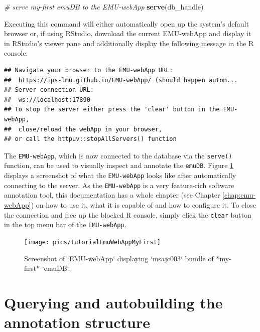 \documentclass[]{book}
\newenvironment{Shaded}{\begin{snugshade}}{\end{snugshade}}
\newcommand{\CommentTok}[1]{\textcolor[rgb]{0.56,0.35,0.01}{\textit{#1}}}
\newcommand{\KeywordTok}[1]{\textcolor[rgb]{0.13,0.29,0.53}{\textbf{#1}}}
\newcommand{\NormalTok}[1]{#1}
\begin{document}
\begin{Shaded}
\begin{Highlighting}[]
\CommentTok{# serve my-first emuDB to the EMU-webApp}
\KeywordTok{serve}\NormalTok{(db_handle)}
\end{Highlighting}
\end{Shaded}

Executing this command will either automatically open up the system's default browser or, if using RStudio, download the current EMU-webApp and display it in RStudio's viewer pane and additionally display the following message in the R console:

\begin{verbatim}
## Navigate your browser to the EMU-webApp URL: 
##  https://ips-lmu.github.io/EMU-webApp/ (should happen autom...
## Server connection URL:
##  ws://localhost:17890
## To stop the server either press the 'clear' button in the EMU-webApp, 
##  close/reload the webApp in your browser,
## or call the httpuv::stopAllServers() function
\end{verbatim}

The \texttt{EMU-webApp}, which is now connected to the database via the \texttt{serve()} function, can be used to visually inspect and annotate the \texttt{emuDB}. Figure \ref{fig:tutorial-emuWebAppMyFirst} displays a screenshot of what the \texttt{EMU-webApp} looks like after automatically connecting to the server. As the \texttt{EMU-webApp} is a very feature-rich software annotation tool, this documentation has a whole chapter (see Chapter \ref{chap:emu-webApp}) on how to use it, what it is capable of and how to configure it. To close the connection and free up the blocked R console, simply click the \texttt{clear} button in the top menu bar of the \texttt{EMU-webApp}.

\begin{figure}

{\centering \texttt{[image: pics/tutorialEmuWebAppMyFirst]} 

}

\caption{Screenshot of `EMU-webApp` displaying `msajc003` bundle of *my-first* `emuDB`.}\label{fig:tutorial-emuWebAppMyFirst}
\end{figure}

\hypertarget{querying-and-autobuilding-the-annotation-structure}{%
\section{Querying and autobuilding the annotation structure}\label{querying-and-autobuilding-the-annotation-structure}}
\end{document}
